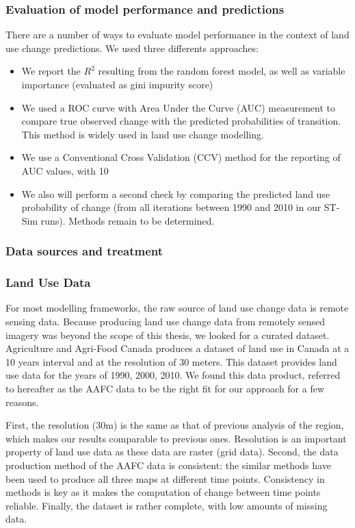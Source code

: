 \subsubsection{Evaluation of model performance and predictions}
There are a number of ways to evaluate model performance in the context of land use change predictions. We used three differents approaches:
\begin{itemize}
  \item We report the $R^{2}$ resulting from the random forest model, as well as variable importance (evaluated as gini impurity score)
  \item We used a ROC curve with Area Under the Curve (AUC) measurement to compare true observed change with the predicted probabilities of transition. This method is widely used  in land use change modelling.
  \item We use a Conventional Cross Validation (CCV) method for the reporting of AUC values, with 10 
  \item We also will perform a second check by comparing the predicted land use probability of change (from all iterations between 1990 and 2010 in our ST-Sim runs). Methods remain to be determined.\\
\end{itemize}

\subsubsection{Data sources and treatment}

\subsubsection*{Land Use Data}
For most modelling frameworks, the raw source of land use change data is remote sensing data. Because producing land use change data from remotely sensed imagery was beyond the scope of this thesis, we looked for a curated dataset. Agriculture and Agri-Food Canada produces a dataset of land use in Canada at a 10 years interval and at the resolution of 30 meters. This dataset provides land use data for the years of 1990, 2000, 2010. We found this data product, referred to hereafter as the AAFC data  to be the right fit for our approach for a few reasons.

First, the resolution (30m) is the same as that of previous analysis of the region, which makes our results comparable to previous ones. Resolution is an important property of land use data as these data are raster (grid data). Second, the data production method of the AAFC  data is consistent: the similar methods have been used to produce all three maps at different time points. Consistency in methods is key as it makes the computation of change between time points reliable. Finally, the dataset is rather complete, with low amounts of missing data.

